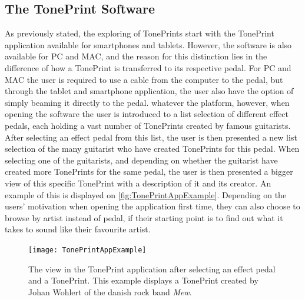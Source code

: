 \subsection{The TonePrint Software}
\label{TonePrintSoftware}
As previously stated, the exploring of TonePrints start with the TonePrint application available for smartphones and tablets. However, the software is also available for PC and MAC, and the reason for this distinction lies in the difference of how a TonePrint is transferred to its respective pedal. For PC and MAC the user is required to use a cable from the computer to the pedal, but through the tablet and smartphone application, the user also have the option of simply beaming it directly to the pedal. whatever the platform, however, when opening the software the user is introduced to a list selection of different effect pedals, each holding a vast number of TonePrints created by famous guitarists. After selecting an effect pedal from this list, the user is then presented a new list selection of the many guitarist who have created TonePrints for this pedal. When selecting one of the guitarists, and depending on whether the guitarist have created more TonePrints for the same pedal, the user is then presented a bigger view of this specific TonePrint with a description of it and its creator. An example of this is displayed on \autoref{fig:TonePrintAppExample}. Depending on the users' motivation when opening the application first time, they can also choose to browse by artist instead of pedal, if their starting point is to find out what it takes to sound like their favourite artist.

\begin{figure}[H]
	\centering
	\texttt{[image: TonePrintAppExample]}
	\caption{The view in the TonePrint application after selecting an effect pedal and a TonePrint. This example displays a TonePrint created by Johan Wohlert of the danish rock band \textit{Mew}.}
	\label{fig:TonePrintAppExample}
\end{figure}






